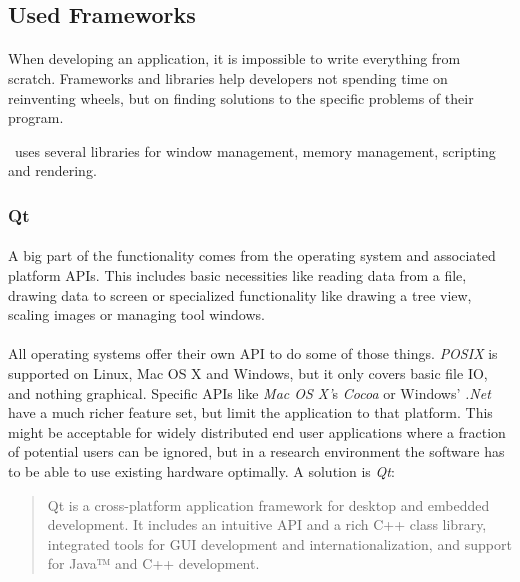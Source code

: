 \subsection{Used Frameworks\label{frameworks}}
\paragraph{}
When developing an application, it is impossible to write everything from scratch.
Frameworks and libraries help developers not spending time on reinventing wheels,
but on finding solutions to the specific problems of their program.

\ER\ uses several libraries for window management, memory management, scripting and rendering.


\subsubsection{Qt}
\paragraph{}
A big part of the functionality comes from the operating system and associated platform APIs.
This includes basic necessities like reading data from a file, drawing data to screen or specialized functionality like drawing a tree view, scaling images or managing tool windows.

\paragraph{}
All operating systems offer their own API to do some of those things.
\textit{POSIX} is supported on Linux, Mac OS X and Windows, but it only covers basic file IO, and nothing graphical.
Specific APIs like \textit{Mac OS X'}s \textit{Cocoa} or Windows' \textit{.Net} have a much richer feature set, but limit the application to that platform.
This might be acceptable for widely distributed end user applications where a fraction of potential users can be ignored,
but in a research environment the software has to be able to use existing hardware optimally.
A solution is \textit{Qt}\cite{qt}:

\begin{quotation}
Qt is a cross-platform application framework for desktop and embedded development. It includes an intuitive API and a rich C++ class library, integrated tools for GUI development and internationalization, and support for Java™ and C++ development.
\end{quotation}

